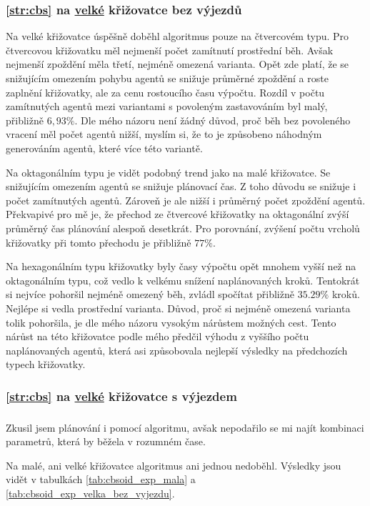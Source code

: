 \subsubsection{\ref{str:cbs} na \hyperref[par:data_velka]{velké} křižovatce bez výjezdů}
\label{subsubsec:exp_cbssg_velka_krizovatka_bez_vyjezdu}

Na velké křižovatce úspěšně doběhl algoritmus pouze na čtvercovém typu.
Pro čtvercovou křižovatku měl nejmenší počet zamítnutí prostřední běh.
Avšak nejmenší zpoždění měla třetí, nejméně omezená varianta.
Opět zde platí, že se snižujícím omezením pohybu agentů se snižuje průměrné zpoždění
a roste zaplnění křižovatky, ale za cenu rostoucího času výpočtu.
Rozdíl v počtu zamítnutých agentů mezi variantami s povoleným zastavováním byl malý, přibližně $6,93\%$.
Dle mého názoru není žádný důvod, proč běh bez povoleného vracení měl počet agentů nižší,
myslím si, že to je způsobeno náhodným generováním agentů, které více  této variantě.

Na oktagonálním typu je vidět podobný trend jako na malé křižovatce.
Se snižujícím omezením agentů se snižuje plánovací čas.
Z toho důvodu se snižuje i počet zamítnutých agentů.
Zároveň je ale nižší i průměrný počet zpoždění agentů.
Překvapivé pro mě je, že přechod ze čtvercové křižovatky na oktagonální zvýší průměrný čas plánování alespoň desetkrát.
Pro porovnání, zvýšení počtu vrcholů křižovatky při tomto přechodu je přibližně $77\%$.

Na hexagonálním typu křižovatky byly časy výpočtu opět mnohem vyšší než na oktagonálním typu,
což vedlo k velkému snížení naplánovaných kroků.
Tentokrát si nejvíce pohoršil nejméně omezený běh, zvládl spočítat přibližně $35.29\%$ kroků.
Nejlépe si vedla prostřední varianta.
Důvod, proč si nejméně omezená varianta tolik pohoršila, je dle mého názoru vysokým nárůstem možných cest.
Tento nárůst na této křižovatce podle mého předčil výhodu z vyššího počtu naplánovaných agentů,
která asi způsobovala nejlepší výsledky na předchozích typech křižovatky.



\subsubsection{\ref{str:cbs} na \hyperref[par:data_velka]{velké} křižovatce s výjezdem}
\label{subsubsec:exp_cbssg_velka_krizovatka_s_vyjezdem}

\subsubsection{}
\label{subsubsec:exp_cbsoid}

Zkusil jsem plánování i pomocí  algoritmu, avšak nepodařilo se mi najít kombinaci parametrů,
která by běžela v rozumném čase.


Na malé, ani velké křižovatce algoritmus ani jednou nedoběhl.
Výsledky jsou vidět v tabulkách \ref{tab:cbsoid_exp_mala} a \ref{tab:cbsoid_exp_velka_bez_vyjezdu}.
